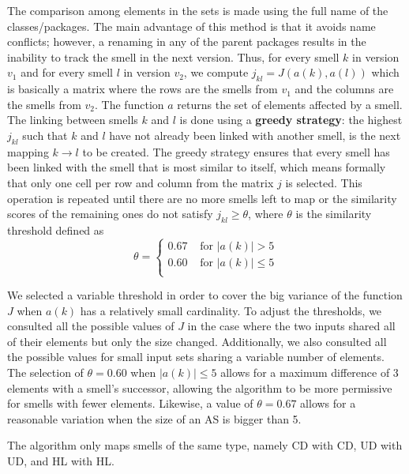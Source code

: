 The comparison among elements in the sets is made using the full name of the classes/packages.
The main advantage of this method is that it avoids name conflicts; however, a renaming in any of the parent packages results in the inability to track the smell in the next version.
Thus, for every smell $k$ in version $v_1$ and for every smell $l$ in version $v_2$, we compute $j_{kl} = J(a(k), a(l))$ which is basically a matrix where the rows are the smells from $v_1$ and the columns are the smells from $v_2$. 
The function $a$ returns the set of elements affected by a smell.
The linking between smells $k$ and $l$ is done using a \textbf{greedy strategy}:
the highest $j_{kl}$ such that $k$ and $l$ have not already been linked with another smell, is the next mapping $k \rightarrow l$ to be created.
The greedy strategy ensures that every smell has been linked with the smell that is most similar to itself, which means formally that only one cell per row and column from the matrix $j$ is selected.
This operation is repeated until there are no more smells left to map or the similarity scores of the remaining ones do not satisfy $j_{kl} \geq \theta$, where $\theta$ is the similarity threshold defined as
\begin{equation*}
\theta = \begin{cases}
     0.67   & \text{ for } |a(k)| > 5 \\ 
     0.60   & \text{ for } |a(k)| \leq 5 \\
    \end{cases}
\end{equation*}

We selected a variable threshold in order to cover the big variance of the function $J$ when $a(k)$ has a relatively small cardinality.
To adjust the thresholds, we consulted all the possible values of $J$ in the case where the two inputs shared all of their elements but only the size changed.
Additionally, we also consulted all the possible values for small input sets sharing a variable number of elements.
The selection of $\theta = 0.60 $ when $|a(k)| \leq 5$ allows for a maximum difference of 3 elements with a smell's successor, allowing the algorithm to be more permissive for smells with fewer elements.
Likewise, a value of $\theta = 0.67$ allows for a reasonable variation when the size of an AS is bigger than 5.

The algorithm only maps smells of the same type, namely CD with CD, UD with UD, and HL with HL.


